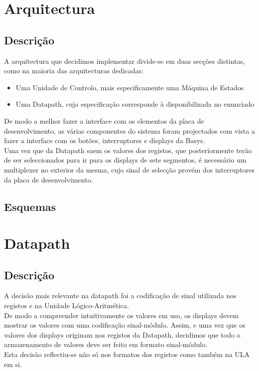\documentclass[a4paper]{article}
\begin{document}


\tableofcontents
\pagebreak

\section{Arquitectura}
\subsection{Descrição}
\indent A arquitectura que decidimos implementar divide-se em duas secções distintas, como na maioria das arquitecturas dedicadas:
\begin{itemize}
\item Uma Unidade de Controlo, mais especificamente uma Máquina de Estados
\item Uma Datapath, cuja especificação corresponde à disponibilizada no enunciado
\end{itemize}
\indent De modo a melhor fazer a interface com os elementos da placa de desenvolvimento, as várias componentes do sistema foram projectados com vista a fazer a interface com os botões, interruptores e displays da Basys.\\
\indent Uma vez que da Datapath saem os valores dos registos, que posteriormente terão de ser seleccionados para ir para os displays de sete segmentos, é necessário um multiplexer no exterior da mesma, cujo sinal de selecção provém dos interruptores da placa de desenvolvimento.\\
\pagebreak
\subsection{Esquemas}
\pagebreak

\section{Datapath}
\subsection{Descrição}
\indent A decisão mais relevante na datapath foi a codificação de sinal utilizada nos registos e na Unidade Lógico-Aritmética.\\
\indent De modo a compreender intuitivamente os valores em uso, os displays devem mostrar os valores com uma codificação sinal-módulo. Assim, e uma vez que os valores dos displays originam nos registos da Datapath, decidimos que todo o armazenamento de valores deve ser feito em formato sinal-módulo.\\
\indent Esta decisão reflectiu-se não só nos formatos dos registos como também na ULA em si.\\
\end{document}
